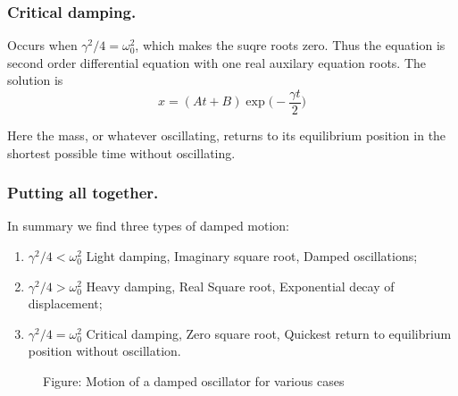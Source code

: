 \documentclass[../../../main.tex]{subfiles}
\begin{document}
\subsubsection{Critical damping.} Occurs when $\gamma^2/4 = \omega_0^2$, which makes the suqre roots zero. Thus the equation is second order differential equation with one real auxilary equation roots. The solution is
\begin{equation*}
    x=(At+B)\exp\biggl(-\frac{\gamma t}{2}\biggr)
\end{equation*}

Here the mass, or whatever oscillating, returns to its equilibrium position in the shortest possible time without oscillating. 

\subsubsection{Putting all together.} In summary we find three types of damped motion:
\begin{enumerate}
    \item $\gamma^2/4<\omega_0^2$ Light damping, Imaginary square root, Damped oscillations;
    \item $\gamma^2/4>\omega_0^2$ Heavy damping, Real Square root, Exponential decay of displacement;
    \item $\gamma^2/4=\omega_0^2$ Critical damping, Zero square root, Quickest return to equilibrium position without oscillation.
\end{enumerate} 
\begin{figure}[h]
    \centering
    \caption*{Figure: Motion of a damped oscillator for various cases}
\end{figure}
\end{document}
